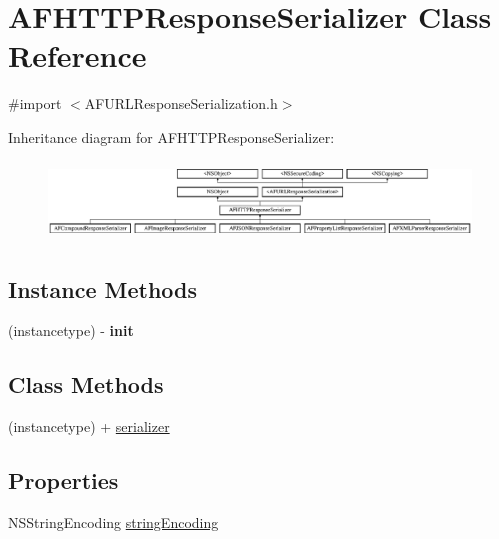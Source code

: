 \hypertarget{interface_a_f_h_t_t_p_response_serializer}{}\section{A\+F\+H\+T\+T\+P\+Response\+Serializer Class Reference}
\label{interface_a_f_h_t_t_p_response_serializer}


{\ttfamily \#import $<$A\+F\+U\+R\+L\+Response\+Serialization.\+h$>$}

Inheritance diagram for A\+F\+H\+T\+T\+P\+Response\+Serializer\+:\begin{figure}[H]
\begin{center}
\leavevmode
\includegraphics[height=2.093458cm]{interface_a_f_h_t_t_p_response_serializer}
\end{center}
\end{figure}
\subsection*{Instance Methods}
\begin{DoxyCompactItemize}
\item 
\hypertarget{interface_a_f_h_t_t_p_response_serializer_ac68c43deaaf530d7b8a6cdd5228e6889}{}(instancetype) -\/ {\bfseries init}\label{interface_a_f_h_t_t_p_response_serializer_ac68c43deaaf530d7b8a6cdd5228e6889}

\end{DoxyCompactItemize}
\subsection*{Class Methods}
\begin{DoxyCompactItemize}
\item 
(instancetype) + \hyperlink{interface_a_f_h_t_t_p_response_serializer_a9aee0c560f22d56f985170b0cdc0617f}{serializer}
\end{DoxyCompactItemize}
\subsection*{Properties}
\begin{DoxyCompactItemize}
\item 
N\+S\+String\+Encoding \hyperlink{interface_a_f_h_t_t_p_response_serializer_a91382381388e01522dabf5c81e91ca62}{string\+Encoding}
\end{DoxyCompactItemize}
